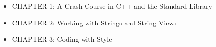 

\begin{itemize}
\item
CHAPTER 1: A Crash Course in C++ and the Standard Library

\item
CHAPTER 2: Working with Strings and String Views

\item
CHAPTER 3: Coding with Style
\end{itemize}